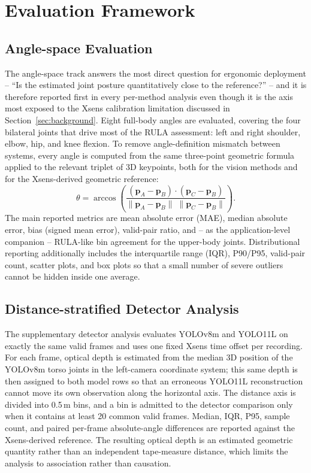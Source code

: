 \documentclass[12pt,a4paper]{article}
\begin{document}
\section{Evaluation Framework}
\label{sec:evaluation}

\subsection{Angle-space Evaluation}

The angle-space track answers the most direct question for ergonomic
deployment -- ``Is the estimated joint posture quantitatively close to
the reference?'' -- and it is therefore reported first in every per-method
analysis even though it is the axis most exposed to the Xsens calibration
limitation discussed in Section~\ref{sec:background}.
Eight full-body angles are evaluated, covering the four bilateral joints
that drive most of the RULA assessment: left and right shoulder, elbow,
hip, and knee flexion.
To remove angle-definition mismatch between systems, every angle is
computed from the same three-point geometric formula applied to the
relevant triplet of 3D keypoints, both for the vision methods and for the
Xsens-derived geometric reference:
\begin{equation}
  \theta = \arccos\!\left(
    \frac{(\mathbf{p}_A-\mathbf{p}_B)\cdot(\mathbf{p}_C-\mathbf{p}_B)}
         {\|\mathbf{p}_A-\mathbf{p}_B\|\;\|\mathbf{p}_C-\mathbf{p}_B\|}
  \right).
\end{equation}
The main reported metrics are mean absolute error (MAE), median absolute
error, bias (signed mean error), valid-pair ratio, and -- as the
application-level companion -- RULA-like bin agreement for the
upper-body joints.  Distributional reporting additionally includes the
interquartile range (IQR), P90/P95, valid-pair count, scatter plots, and box
plots so that a small number of severe outliers cannot be hidden inside one
average.

\subsection{Distance-stratified Detector Analysis}
\label{sec:distance_method}

The supplementary detector analysis evaluates YOLOv8m and YOLO11L on exactly
the same valid frames and uses one fixed Xsens time offset per recording.
For each frame, optical depth is estimated from the median 3D position of the
YOLOv8m torso joints in the left-camera coordinate system; this same depth is
then assigned to both model rows so that an erroneous YOLO11L reconstruction
cannot move its own observation along the horizontal axis.  The distance
axis is divided into 0.5\,m bins, and a bin is admitted to the detector
comparison only when it contains at least 20 common valid frames.  Median,
IQR, P95, sample count, and paired per-frame absolute-angle differences are
reported against the Xsens-derived reference.  The resulting optical depth
is an estimated geometric quantity rather than an independent tape-measure
distance, which limits the analysis to association rather than causation.
\end{document}
